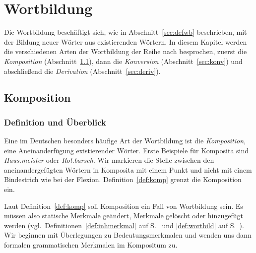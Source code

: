\chapter{Wortbildung}

\label{sec:wortbildung}

Die Wortbildung beschäftigt sich, wie in Abschnitt~\ref{sec:defwb} beschrieben, mit der Bildung neuer Wörter aus existierenden Wörtern.
In diesem Kapitel werden die verschiedenen Arten der Wortbildung der Reihe nach besprochen, zuerst die \textit{Komposition} (Abschnitt~\ref{sec:komp}), dann die \textit{Konversion} (Abschnitt~\ref{sec:konv}) und abschließend die \textit{Derivation} (Abschnitt~\ref{sec:deriv}).
 
\section{Komposition}

\label{sec:komp}

\subsection{Definition und Überblick}


Eine im Deutschen besonders häufige Art der Wortbildung ist die \textit{Komposition}, eine Aneinanderfügung existierender Wörter.
Erste Beispiele für Komposita sind \textit{Haus.meister} oder \textit{Rot.barsch}.
Wir markieren die Stelle zwischen den aneinandergefügten Wörtern in Komposita mit einem Punkt und nicht mit einem Bindestrich wie bei der Flexion.
Definition~\ref{def:komp} grenzt die Komposition ein.


Laut Definition~\ref{def:komp} soll Komposition ein Fall von Wortbildung sein.
Es müssen also statische Merkmale geändert, Merkmale gelöscht oder hinzugefügt werden (vgl.\ Definitionen~\ref{def:inhmerkmal} auf S.~\pageref{def:inhmerkmal} und \ref{def:wortbild} auf S.~\pageref{def:wortbild}).
Wir beginnen mit Überlegungen zu Bedeutungsmerkmalen und wenden uns dann formalen grammatischen Merkmalen im Kompositum zu.

